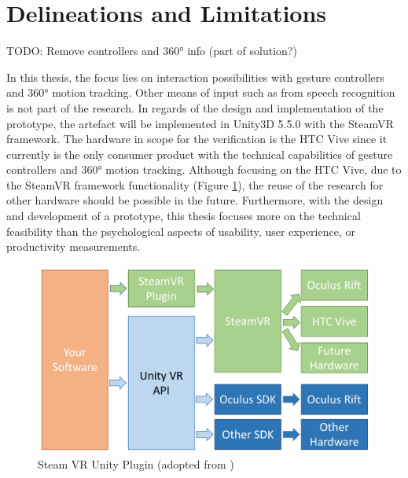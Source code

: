 



\section{Delineations and Limitations}

TODO: Remove controllers and 360° info (part of solution?)

In this thesis, the focus lies on interaction possibilities with gesture controllers and 360° motion tracking. Other means of input such as from speech recognition is not part of the research.
In regards of the design and implementation of the prototype, the artefact will be implemented in Unity3D 5.5.0 with the SteamVR framework. The hardware in scope for the verification is the HTC Vive since it currently is the only consumer product with the  technical capabilities of gesture controllers and 360° motion tracking. Although focusing on the HTC Vive, due to the SteamVR framework functionality (Figure \ref{fig:steamvr}), the reuse of the research for other hardware should be possible in the future. \newline
Furthermore, with the design and development of a prototype, this thesis focuses more on the technical feasibility than the psychological aspects of usability, user experience, or productivity measurements. 
\begin{figure}[h]
	\begin{center}
		\includegraphics[width=14cm]{03_Figures/04_Valve/OpenVR_SteamVR.png}
		\caption[Steam VR Unity Plugin]{Steam VR Unity Plugin (adopted from \cite{Valve2016})}
		\label{fig:steamvr}
	\end{center}
\end{figure}


